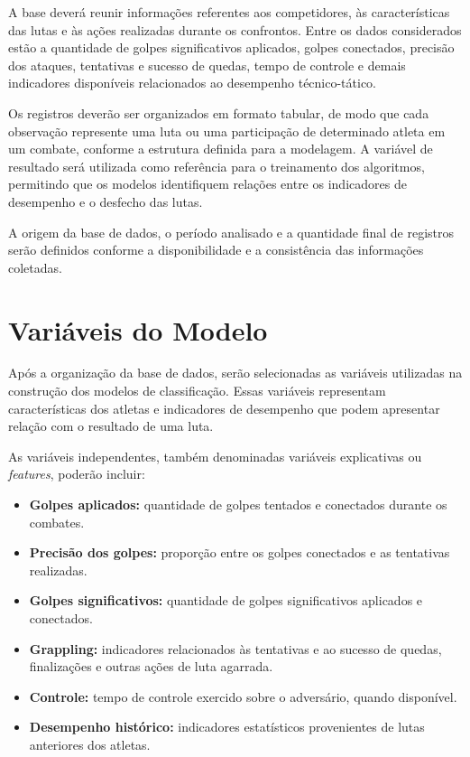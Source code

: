 \documentclass[12pt,a4paper]{report}
\begin{document}
A base deverá reunir informações referentes aos competidores, às características das lutas e às ações realizadas durante os confrontos. Entre os dados considerados estão a quantidade de golpes significativos aplicados, golpes conectados, precisão dos ataques, tentativas e sucesso de quedas, tempo de controle e demais indicadores disponíveis relacionados ao desempenho técnico-tático.

Os registros deverão ser organizados em formato tabular, de modo que cada observação represente uma luta ou uma participação de determinado atleta em um combate, conforme a estrutura definida para a modelagem. A variável de resultado será utilizada como referência para o treinamento dos algoritmos, permitindo que os modelos identifiquem relações entre os indicadores de desempenho e o desfecho das lutas.

A origem da base de dados, o período analisado e a quantidade final de registros serão definidos conforme a disponibilidade e a consistência das informações coletadas.

\section{Variáveis do Modelo}

Após a organização da base de dados, serão selecionadas as variáveis utilizadas na construção dos modelos de classificação. Essas variáveis representam características dos atletas e indicadores de desempenho que podem apresentar relação com o resultado de uma luta.

As variáveis independentes, também denominadas variáveis explicativas ou \textit{features}, poderão incluir:

\begin{itemize}[leftmargin=2em]
    \item \textbf{Golpes aplicados:} quantidade de golpes tentados e conectados durante os combates.
    \item \textbf{Precisão dos golpes:} proporção entre os golpes conectados e as tentativas realizadas.
    \item \textbf{Golpes significativos:} quantidade de golpes significativos aplicados e conectados.
    \item \textbf{Grappling:} indicadores relacionados às tentativas e ao sucesso de quedas, finalizações e outras ações de luta agarrada.
    \item \textbf{Controle:} tempo de controle exercido sobre o adversário, quando disponível.
    \item \textbf{Desempenho histórico:} indicadores estatísticos provenientes de lutas anteriores dos atletas.
\end{itemize}
\end{document}
